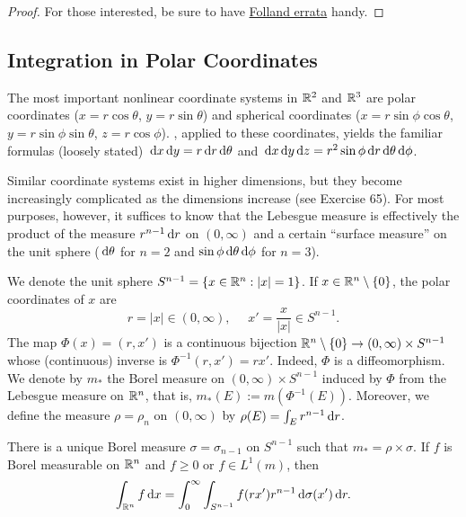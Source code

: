 \documentclass[12pt]{article} %
\begin{document}
\begin{proof}
    For those interested, be sure to have \href{https://sites.math.washington.edu//~folland/Homepage/oldreals.pdf}{Folland errata} handy.
\end{proof}

\subsection{Integration in Polar Coordinates}\label{sec:polar-integration}

The most important nonlinear coordinate systems in $\mathbb{R}^2$ and $\mathbb{R}^3$ are polar coordinates ($x = r \cos \theta$, $y = r \sin \theta$) and spherical coordinates ($x = r \sin \phi \cos \theta$, $y = r \sin \phi \sin \theta$, $z = r \cos \phi$). , applied to these coordinates, yields the familiar formulas (loosely stated) $\, \mathrm{d} x \, \mathrm{d} y = r \, \mathrm{d} r \, \mathrm{d} \theta$ and $\, \mathrm{d} x \, \mathrm{d} y \, \mathrm{d} z = r^2 \sin \phi \, \mathrm{d} r \, \mathrm{d} \theta \, \mathrm{d} \phi$. 

Similar coordinate systems exist in higher dimensions, but they become increasingly complicated as the dimensions increase (see Exercise 65). For most purposes, however, it suffices to know that the Lebesgue measure is effectively the product of the measure $r^{n-1} \, \mathrm{d} r$ on $(0, \infty)$ and a certain ``surface measure'' on the unit sphere ($\, \mathrm{d} \theta$ for $n = 2$ and $\sin \phi \, \mathrm{d}\theta \, \mathrm{d}\phi$ for $n = 3$).

\begin{definition}
    We denote the unit sphere $S^{n-1} = \{x \in \mathbb{R}^n : |x| = 1\}$. If $x \in \mathbb{R}^n \setminus \{0\}$, the polar coordinates of $x$ are \[r = |x| \in (0, \infty), \ \ \ \ \ \ x' = \frac{x}{|x|} \in S^{n-1}.\] The map $\Phi(x) = (r, x')$ is a continuous bijection $\mathbb{R}^n \setminus \{0\} \to (0, \infty) \times S^{n-1}$ whose (continuous) inverse is $\Phi^{-1}(r, x') = rx'$. Indeed, $\Phi$ is a diffeomorphism. We denote by $m_*$ the Borel measure on $(0, \infty) \times S^{n-1}$ induced by $\Phi$ from the Lebesgue measure on $\mathbb{R}^n$, that is, $m_*(E) := m(\Phi^{-1}(E))$. Moreover, we define the measure $\rho = \rho_n$ on $(0, \infty)$ by $\rho(E) = \int_E r^{n-1}\, \mathrm{d} r$.
\end{definition}

\begin{theorem}
    There is a unique Borel measure $\sigma = \sigma_{n-1}$ on $S^{n-1}$ such that $m_* = \rho \times \sigma$. If $f$ is Borel measurable on $\mathbb{R}^n$ and $f \geq 0$ or $f \in L^1(m)$, then \begin{align}\label{eq:2.50}
        \int_{\mathbb{R}^n}f \, \mathrm{d} x = \int_0^\infty \int_{S^{n-1}} f(rx') r^{n-1} \, \mathrm{d} \sigma(x') \, \mathrm{d} r.
    \end{align}
\end{theorem}
\end{document}
